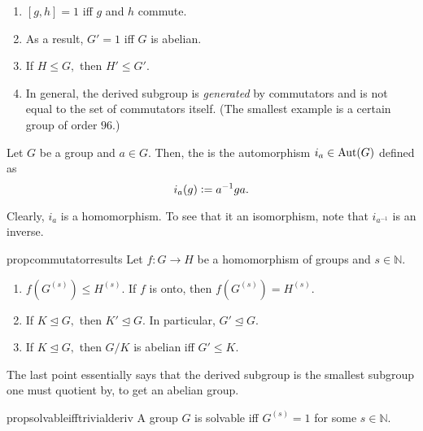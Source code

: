 \begin{rem}
	\phantom{hi}
	\begin{enumerate}
		\item $[g, h] = 1$ iff $g$ and $h$ commute.
		\item As a result, $G' = 1$ iff $G$ is abelian.
		\item If $H \le G,$ then $H' \le G'.$
		\item In general, the derived subgroup is \emph{generated} by commutators and is not equal to the set of commutators itself. (The smallest example is a certain group of order $96.$)
	\end{enumerate}
\end{rem}

\begin{defn}%
	Let $G$ be a group and $a \in G.$ Then, the  is the automorphism $i_a \in \operatorname{Aut}(G)$ defined as
	\begin{equation*} 
		i_a(g) \vcentcolon= a^{-1}ga.
	\end{equation*}
\end{defn}

Clearly, $i_a$ is a homomorphism. To see that it an isomorphism, note that $i_{a^{-1}}$ is an inverse.

\begin{restatable}[]{prop}{commutatorresults}
\label{prop:commutatorresults}
	Let $f : G \to H$ be a homomorphism of groups and $s \in \mathbb{N}.$
	\begin{enumerate}
	 	\item $f(G^{(s)}) \le H^{(s)}.$ If $f$ is onto, then $f(G^{(s)}) = H^{(s)}.$
	 	\item If $K \unlhd G,$ then $K' \unlhd G.$ In particular, $G' \unlhd G.$
	 	\item If $K \unlhd G,$ then $G/K$ is abelian iff $G' \le K.$ \hfill\hyperref[prop:commutatorresults2]{\downsym}
	 \end{enumerate} 
\end{restatable}

\begin{rem}
	The last point essentially says that the derived subgroup is the smallest subgroup one must quotient by, to get an abelian group.
\end{rem}

\begin{restatable}[]{prop}{solvableifftrivialderiv}
\label{prop:solvableifftrivialderiv}
	A group $G$ is solvable iff $G^{(s)} = 1$ for some $s \in \mathbb{N}.$ \hfill\hyperref[prop:solvableifftrivialderiv2]{\downsym}
\end{restatable}

